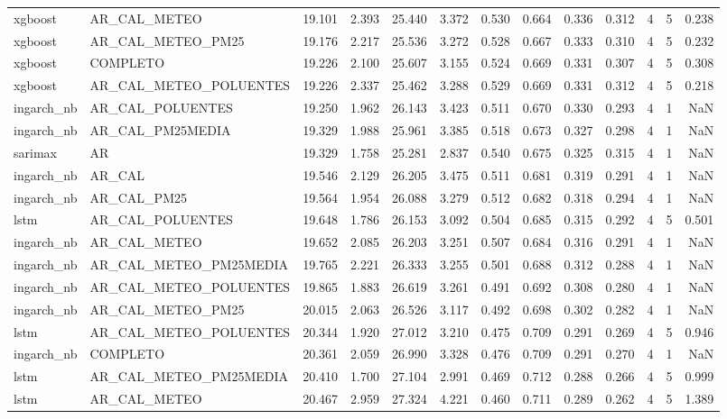 \begin{tabular}{llrrrrrrrrrrr}
xgboost & AR_CAL_METEO & 19.101 & 2.393 & 25.440 & 3.372 & 0.530 & 0.664 & 0.336 & 0.312 & 4 & 5 & 0.238 \\
xgboost & AR_CAL_METEO_PM25 & 19.176 & 2.217 & 25.536 & 3.272 & 0.528 & 0.667 & 0.333 & 0.310 & 4 & 5 & 0.232 \\
xgboost & COMPLETO & 19.226 & 2.100 & 25.607 & 3.155 & 0.524 & 0.669 & 0.331 & 0.307 & 4 & 5 & 0.308 \\
xgboost & AR_CAL_METEO_POLUENTES & 19.226 & 2.337 & 25.462 & 3.288 & 0.529 & 0.669 & 0.331 & 0.312 & 4 & 5 & 0.218 \\
ingarch_nb & AR_CAL_POLUENTES & 19.250 & 1.962 & 26.143 & 3.423 & 0.511 & 0.670 & 0.330 & 0.293 & 4 & 1 & NaN \\
ingarch_nb & AR_CAL_PM25MEDIA & 19.329 & 1.988 & 25.961 & 3.385 & 0.518 & 0.673 & 0.327 & 0.298 & 4 & 1 & NaN \\
sarimax & AR & 19.329 & 1.758 & 25.281 & 2.837 & 0.540 & 0.675 & 0.325 & 0.315 & 4 & 1 & NaN \\
ingarch_nb & AR_CAL & 19.546 & 2.129 & 26.205 & 3.475 & 0.511 & 0.681 & 0.319 & 0.291 & 4 & 1 & NaN \\
ingarch_nb & AR_CAL_PM25 & 19.564 & 1.954 & 26.088 & 3.279 & 0.512 & 0.682 & 0.318 & 0.294 & 4 & 1 & NaN \\
lstm & AR_CAL_POLUENTES & 19.648 & 1.786 & 26.153 & 3.092 & 0.504 & 0.685 & 0.315 & 0.292 & 4 & 5 & 0.501 \\
ingarch_nb & AR_CAL_METEO & 19.652 & 2.085 & 26.203 & 3.251 & 0.507 & 0.684 & 0.316 & 0.291 & 4 & 1 & NaN \\
ingarch_nb & AR_CAL_METEO_PM25MEDIA & 19.765 & 2.221 & 26.333 & 3.255 & 0.501 & 0.688 & 0.312 & 0.288 & 4 & 1 & NaN \\
ingarch_nb & AR_CAL_METEO_POLUENTES & 19.865 & 1.883 & 26.619 & 3.261 & 0.491 & 0.692 & 0.308 & 0.280 & 4 & 1 & NaN \\
ingarch_nb & AR_CAL_METEO_PM25 & 20.015 & 2.063 & 26.526 & 3.117 & 0.492 & 0.698 & 0.302 & 0.282 & 4 & 1 & NaN \\
lstm & AR_CAL_METEO_POLUENTES & 20.344 & 1.920 & 27.012 & 3.210 & 0.475 & 0.709 & 0.291 & 0.269 & 4 & 5 & 0.946 \\
ingarch_nb & COMPLETO & 20.361 & 2.059 & 26.990 & 3.328 & 0.476 & 0.709 & 0.291 & 0.270 & 4 & 1 & NaN \\
lstm & AR_CAL_METEO_PM25MEDIA & 20.410 & 1.700 & 27.104 & 2.991 & 0.469 & 0.712 & 0.288 & 0.266 & 4 & 5 & 0.999 \\
lstm & AR_CAL_METEO & 20.467 & 2.959 & 27.324 & 4.221 & 0.460 & 0.711 & 0.289 & 0.262 & 4 & 5 & 1.389 \\

\end{tabular}
